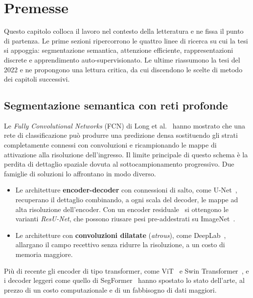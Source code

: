 \chapter{Premesse}
\label{cap:premesse}

Questo capitolo colloca il lavoro nel contesto della letteratura e ne fissa il punto di
partenza. Le prime sezioni ripercorrono le quattro linee di ricerca su cui la tesi si appoggia:
segmentazione semantica, attenzione efficiente, rappresentazioni discrete e apprendimento
auto-supervisionato. Le ultime riassumono la tesi del 2022 e ne propongono una lettura critica,
da cui discendono le scelte di metodo dei capitoli successivi.

\section{Segmentazione semantica con reti profonde}
\label{sec:stato-segmentazione}

Le \emph{Fully Convolutional Networks} (FCN) di Long et al.~\cite{long2015fcn} hanno mostrato
che una rete di classificazione può produrre una predizione densa sostituendo gli strati
completamente connessi con convoluzioni e ricampionando le mappe di attivazione alla risoluzione
dell'ingresso. Il limite principale di questo schema è la perdita di dettaglio spaziale dovuta
al sottocampionamento progressivo. Due famiglie di soluzioni lo affrontano in modo diverso.

\begin{itemize}
  \item Le architetture \textbf{encoder-decoder} con connessioni di salto, come
  U-Net~\cite{ronneberger2015unet}, recuperano il dettaglio combinando, a ogni scala del
  decoder, le mappe ad alta risoluzione dell'encoder. Con un encoder residuale~\cite{he2016resnet}
  si ottengono le varianti \emph{ResU-Net}, che possono riusare pesi pre-addestrati su
  ImageNet~\cite{deng2009imagenet}.
  \item Le architetture con \textbf{convoluzioni dilatate} (\emph{atrous}), come
  DeepLab~\cite{chen2018deeplab}, allargano il campo recettivo senza ridurre la risoluzione,
  a un costo di memoria maggiore.
\end{itemize}

Più di recente gli encoder di tipo transformer, come ViT~\cite{dosovitskiy2021vit} e Swin
Transformer~\cite{liu2021swin}, e i decoder leggeri come quello di
SegFormer~\cite{xie2021segformer} hanno spostato lo stato dell'arte, al prezzo di un costo
computazionale e di un fabbisogno di dati maggiori.

